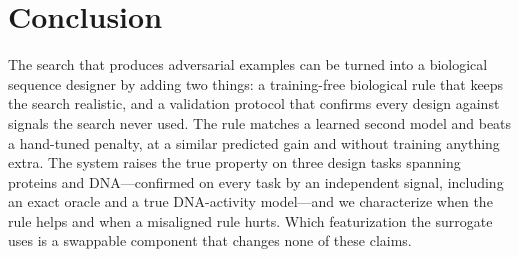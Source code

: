 \documentclass{article}
\begin{document}
\section{Conclusion}

The search that produces adversarial examples can be turned into a biological sequence
designer by adding two things: a training-free biological rule that keeps the search
realistic, and a validation protocol that confirms every design against signals the search
never used. The rule matches a learned second model and beats a hand-tuned penalty, at a
similar predicted gain and without training anything extra. The system raises the true
property on three design tasks spanning proteins and DNA---confirmed on every task by an
independent signal, including an exact oracle and a true DNA-activity model---and we
characterize when the rule helps and when a misaligned rule hurts. Which featurization the
surrogate uses is a swappable component that changes none of these claims.

\small


\end{document}
